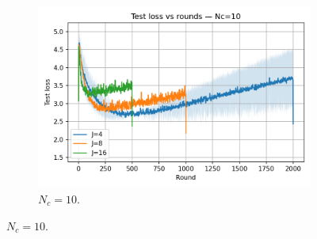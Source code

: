 \documentclass[10pt,twocolumn,letterpaper]{article}
\begin{document}
\begin{figure}[H]
\begin{subfigure}[b]{0.32\linewidth}
    \includegraphics[width=\linewidth]{heter_figs/loss_vs_rounds_Nc_10.png}
    \caption{\(N_c=10\).}
  \end{subfigure}

  \vspace{2mm}


\end{figure}
\end{document}
